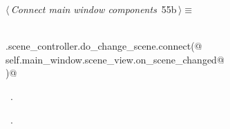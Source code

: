 \documentclass[
    a4paper,      %
    10pt,         %
    openright,    %
    notitlepage,  %
    parskip=half, %
]{scrreprt}       %
\theoremstyle{definition}                    %
\begin{document}
\begin{flushleft} \small
\begin{minipage}{\linewidth}\label{scrap88}\raggedright\small
{} $\langle\,${\itshape Connect main window components}\nobreak\ {\footnotesize {55b}}$\,\rangle\equiv$
\vspace{-1ex}
\begin{list}{}{} \item
\mbox{}\lstinline@@\\
\mbox{}\lstinline@self.scene_controller.do_change_scene.connect(@\\
\mbox{}\lstinline@    self.main_window.scene_view.on_scene_changed@\\
\mbox{}\lstinline@)@{\NWsep}
\end{list}
\vspace{-1.5ex}
\footnotesize
\begin{list}{}{\setlength{\itemsep}{-\parsep}\setlength{\itemindent}{-\leftmargin}}
\item \NWtxtMacroDefBy\ .
\item \NWtxtMacroRefIn\ .

\item{}
\end{list}
\end{minipage}\vspace{4ex}
\end{flushleft}
\end{document}
